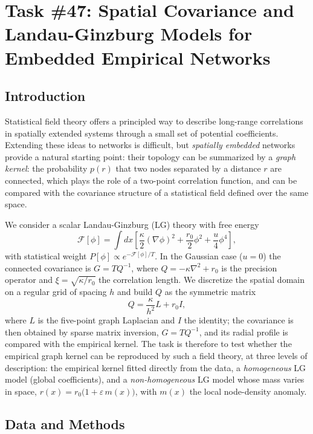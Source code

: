 \chapter{Task \#47: Spatial Covariance and Landau-Ginzburg Models for Embedded Empirical Networks}

\section{Introduction}

Statistical field theory offers a principled way to describe long-range correlations in spatially extended
systems through a small set of potential coefficients. Extending these ideas to
networks is difficult, but \emph{spatially embedded} networks provide a natural
starting point: their topology can be summarized by a \emph{graph kernel}: the probability $p(r)$ that two
nodes separated by a distance $r$ are connected, which plays the role of a two-point correlation function, and
can be compared with the covariance structure of a statistical field defined over the same space.

\noindent We consider a scalar Landau-Ginzburg (LG) theory with free energy
\begin{equation}
\mathcal{F}[\phi] = \int dx\left[\frac{\kappa}{2}(\nabla\phi)^2 + \frac{r_0}{2}\phi^2 + \frac{u}{4}\phi^4\right],
\end{equation}
with statistical weight $P[\phi]\propto e^{-\mathcal{F}[\phi]/T}$. In the Gaussian case ($u=0$) the connected
covariance is $G=TQ^{-1}$, where $Q=-\kappa\nabla^2+r_0$ is the precision operator and
$\xi=\sqrt{\kappa/r_0}$ the correlation length. We discretize the spatial domain on a regular grid of 
spacing $h$ and build $Q$ as the symmetric matrix
\begin{equation}
Q=\frac{\kappa}{h^2}L+r_0 I,
\end{equation}
where $L$ is the five-point graph Laplacian and $I$ the identity; the covariance is then obtained by sparse
matrix inversion, $G=TQ^{-1}$, and its radial profile is compared with the empirical kernel. The task is
therefore to test whether the empirical graph kernel can be reproduced by such a field theory, at three levels
of description: the empirical kernel fitted directly from the data, a \emph{homogeneous} LG model (global
coefficients), and a \emph{non-homogeneous} LG model whose mass varies in space,
$r(x)=r_0\bigl(1+\varepsilon\, m(x)\bigr)$, with $m(x)$ the local node-density anomaly.

\section{Data and Methods}

